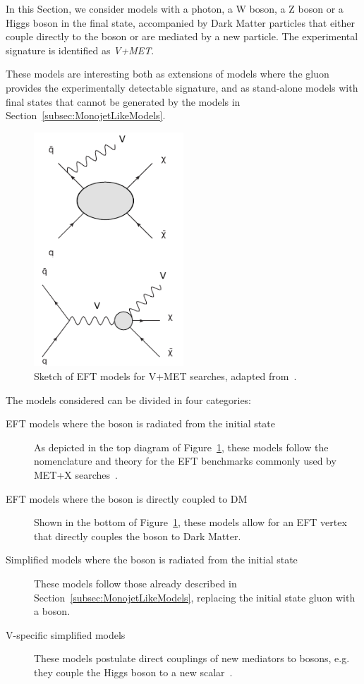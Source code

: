 
In this Section, we consider models with a photon, a W boson, a Z boson or a Higgs boson in the final state, 
accompanied by Dark Matter particles that either couple directly to the boson or are mediated by 
a new particle. The experimental signature is identified as \textit{V+MET}. 

These models are interesting both as extensions of models where the gluon provides 
the experimentally detectable signature, 
and as stand-alone models with final states that cannot be generated by the models in
Section~\ref{subsec:MonojetLikeModels}.


\begin{figure}[h!]
  \centering
    \includegraphics[width=0.5\textwidth]{figures/VPlusMET_EFT}
  \caption{Sketch of EFT models for V+MET searches, adapted from~\citep{Nelson:2013pqa}. \label{fig:VPlusMET_EFT}}
\end{figure}
% 
The models considered can be divided in four categories:
\begin{description}
 \item[EFT models where the boson is radiated from the initial state] As depicted in 
 the top diagram of Figure~\ref{fig:VPlusMET_EFT}, these  models follow the nomenclature and theory 
 for the EFT benchmarks commonly used by MET+X searches~\cite{Goodman:2010ku}. 
 \item[EFT models where the boson is directly coupled to DM] Shown in the bottom of Figure~\ref{fig:VPlusMET_EFT},
 these models allow for an EFT vertex that directly couples the boson to Dark Matter. 
 \item[Simplified models where the boson is radiated from the initial state] These models follow those
 already described in Section~\ref{subsec:MonojetLikeModels}, replacing the initial state gluon with a boson.
 \item[V-specific simplified models] These models postulate direct couplings of new mediators
 to bosons, e.g. they couple the Higgs boson to a new scalar~\citep{Carpenter:2013xra}. 
\end{description}


